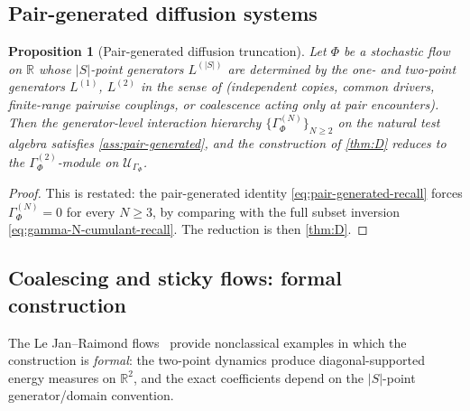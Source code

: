 \documentclass[11pt,reqno]{amsart}
\theoremstyle{plain}
\newtheorem{proposition}[theorem]{Proposition}
\theoremstyle{definition}
\theoremstyle{remark}
\newcommand{\R}{\mathbb{R}}
\newcommand{\cU}{\mathcal U}
\begin{document}
\subsection{Pair-generated diffusion systems}\label{sec:bench-pairgen}

\begin{proposition}[Pair-generated diffusion truncation]\label{prop:pairgen-diffusion}
Let $\Phi$ be a stochastic flow on $\R$ whose $|S|$-point
generators $L^{(|S|)}$ are determined by the one- and two-point
generators $L^{(1)}$, $L^{(2)}$ in the sense of
\cite[Eq.~(6.13)]{PrimitiveDivergence} (independent copies,
common drivers, finite-range pairwise couplings, or coalescence
acting only at pair encounters). Then the
generator-level interaction hierarchy
$\{\Gamma^{(N)}_{\Phi}\}_{N\ge 2}$ on the natural test algebra
satisfies \cref{ass:pair-generated}, and the construction of
\cref{thm:D} reduces to the $\Gamma^{(2)}_{\Phi}$-module on
$\cU_{\Gamma_{\Phi}}$.
\end{proposition}

\begin{proof}
This is \cite[Prop.~6.13]{PrimitiveDivergence} restated: the
pair-generated identity \eqref{eq:pair-generated-recall} forces
$\Gamma^{(N)}_{\Phi}=0$ for every $N\ge 3$, by comparing with
the full subset inversion \eqref{eq:gamma-N-cumulant-recall}.
The reduction is then \cref{thm:D}.
\end{proof}

\subsection{Coalescing and sticky flows: formal construction}\label{sec:bench-sticky}

The Le Jan--Raimond flows~\cite{LeJanRaimond2004} provide
nonclassical examples in which the construction is \emph{formal}:
the two-point dynamics produce diagonal-supported energy measures
on $\R^{2}$, and the exact coefficients depend on the
$|S|$-point generator/domain convention.
\end{document}
